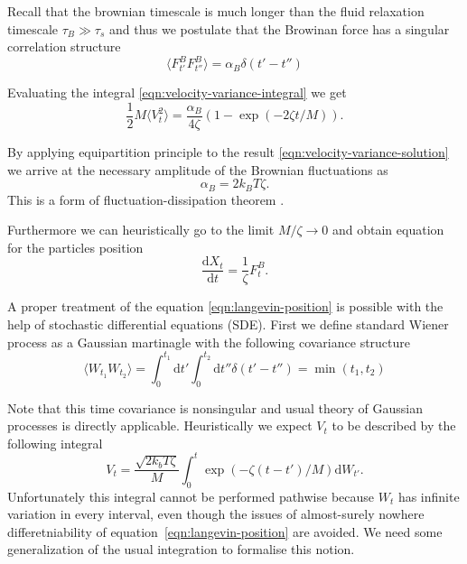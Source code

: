 \documentclass{doctoral}
\newcommand{\dd}{\mathrm{d}}
\begin{document}
Recall that the brownian timescale is much longer than the fluid relaxation timescale $\tau_B \gg \tau_s$ and thus we postulate that the Browinan force has a singular correlation structure
\begin{equation}
    \langle F_{t'}^B F_{t''}^B \rangle = \alpha_B \delta(t'-t'') \label{eqn:white-noise-langevin}
\end{equation}

Evaluating the integral \eqref{eqn:velocity-variance-integral} we get
\begin{equation}
    \frac{1}{2} M \langle V_t^2 \rangle = \frac{\alpha_B}{4 \zeta} (1 - \exp(-2\zeta t / M)).
    \label{eqn:velocity-variance-solution}
\end{equation}

By applying equipartition principle to the result \eqref{eqn:velocity-variance-solution} we arrive at the necessary amplitude of the Brownian fluctuations as
\begin{equation}
    \alpha_B = 2 k_B T \zeta.
    \label{eqn:fluctuation-dissipation-raighley-particle}
\end{equation}
This is a form of fluctuation-dissipation theorem \cite{van_Kampen_1984,Ottinger_2012}.

Furthermore we can heuristically go to the limit $M/\zeta \to 0$ and obtain equation for the particles position
\begin{equation}
    \frac{\dd X_t}{\dd t} = \frac{1}{\zeta} F_t^B.
    \label{eqn:langevin-position}
\end{equation}

A proper treatment of the equation \eqref{eqn:langevin-position} is possible with the help of stochastic differential equations (SDE).
First we define standard Wiener process as a Gaussian martinagle with the following covariance structure
\begin{equation}
    \langle W_{t_1} W_{t_2} \rangle = \int_0^{t_1} \dd t' \int_0^{t_2} \dd t'' \delta(t' - t'') = \min(t_1, t_2) \label{eqn:wiener-process-definition}
\end{equation}

Note that this time covariance is nonsingular and usual theory of Gaussian processes is directly applicable.
Heuristically we expect $V_t$ to be described by the following integral
\begin{equation}
    V_t = \frac{\sqrt{2 k_b T \zeta}}{M} \int_0^t \exp\left( -\zeta(t - t')/M \right) \dd W_{t'}.
    \label{eqn:velocity-integral-sde}
\end{equation}
Unfortunately this integral cannot be performed pathwise because $W_t$ has infinite variation in every interval, even though the issues of almost-surely nowhere differetniability of equation~\eqref{eqn:langevin-position} are avoided.
We need some generalization of the usual integration to formalise this notion.
\end{document}
